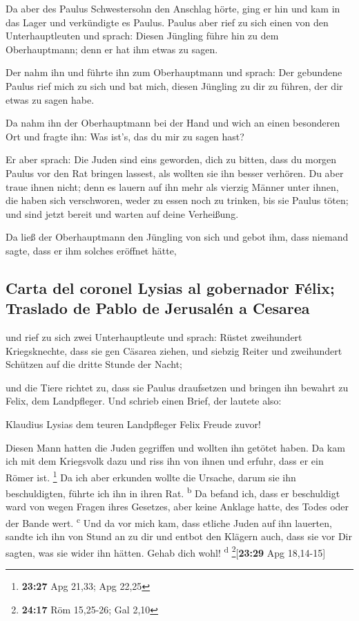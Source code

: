  Da aber des Paulus Schwestersohn den Anschlag hörte,
ging er hin und kam in das Lager und verkündigte es Paulus.
 Paulus aber rief zu sich einen von den Unterhauptleuten
und sprach: Diesen Jüngling führe hin zu dem Oberhauptmann; denn er hat
ihm etwas zu sagen.

 Der nahm ihn und führte ihn zum Oberhauptmann und
sprach: Der gebundene Paulus rief mich zu sich und bat mich, diesen
Jüngling zu dir zu führen, der dir etwas zu sagen habe.

 Da nahm ihn der Oberhauptmann bei der Hand und wich an
einen besonderen Ort und fragte ihn: Was ist's, das du mir zu sagen
hast?

 Er aber sprach: Die Juden sind eins geworden, dich zu
bitten, dass du morgen Paulus vor den Rat bringen lassest, als wollten
sie ihn besser verhören.  Du aber traue ihnen nicht; denn
es lauern auf ihn mehr als vierzig Männer unter ihnen, die haben sich
verschworen, weder zu essen noch zu trinken, bis sie Paulus töten; und
sind jetzt bereit und warten auf deine Verheißung.

 Da ließ der Oberhauptmann den Jüngling von sich und
gebot ihm, dass niemand sagte, dass er ihm solches eröffnet hätte,

\hypertarget{carta-del-coronel-lysias-al-gobernador-fuxe9lix-traslado-de-pablo-de-jerusaluxe9n-a-cesarea}{%
\subsection{Carta del coronel Lysias al gobernador Félix; Traslado de
Pablo de Jerusalén a
Cesarea}\label{carta-del-coronel-lysias-al-gobernador-fuxe9lix-traslado-de-pablo-de-jerusaluxe9n-a-cesarea}}

 und rief zu sich zwei Unterhauptleute und sprach: Rüstet
zweihundert Kriegsknechte, dass sie gen Cäsarea ziehen, und siebzig
Reiter und zweihundert Schützen auf die dritte Stunde der Nacht;

 und die Tiere richtet zu, dass sie Paulus draufsetzen
und bringen ihn bewahrt zu Felix, dem Landpfleger.  Und
schrieb einen Brief, der lautete also:

 Klaudius Lysias dem teuren Landpfleger Felix Freude
zuvor!

 Diesen Mann hatten die Juden gegriffen und wollten ihn
getötet haben. Da kam ich mit dem Kriegsvolk dazu und riss ihn von ihnen
und erfuhr, dass er ein Römer ist. \footnote{\textbf{23:27} Apg 21,33;
  Apg 22,25}  Da ich aber erkunden wollte die Ursache,
darum sie ihn beschuldigten, führte ich ihn in ihren Rat.
\textsuperscript{b}  Da befand ich, dass er beschuldigt
ward von wegen Fragen ihres Gesetzes, aber keine Anklage hatte, des
Todes oder der Bande wert. \textsuperscript{c}  Und da
vor mich kam, dass etliche Juden auf ihn lauerten, sandte ich ihn von
Stund an zu dir und entbot den Klägern auch, dass sie vor Dir sagten,
was sie wider ihn hätten. Gehab dich wohl! \textsuperscript{d}
\footnote{\textbf{24:17} Röm 15,25-26; Gal 2,10}{[}\textbf{23:29} Apg
18,14-15{]}

